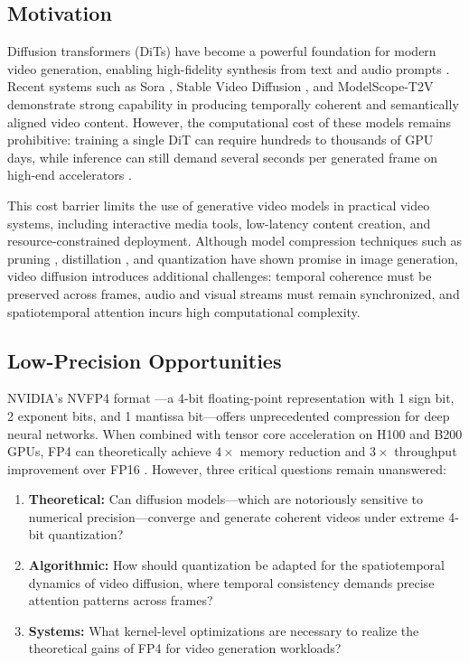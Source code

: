 \documentclass[journal,twoside]{IEEEtran}
\theoremstyle{definition}
\theoremstyle{remark}
\begin{document}
\subsection{Motivation}
Diffusion transformers (DiTs) \cite{peebles2023scalable} have become a powerful foundation for modern video generation, enabling high-fidelity synthesis from text and audio prompts \cite{ho2022imagen, singer2023make, rombach2022high}. Recent systems such as Sora \cite{openai2024sora}, Stable Video Diffusion \cite{stability2023svd}, and ModelScope-T2V \cite{wang2023modelscope} demonstrate strong capability in producing temporally coherent and semantically aligned video content. However, the computational cost of these models remains prohibitive: training a single DiT can require hundreds to thousands of GPU days, while inference can still demand several seconds per generated frame on high-end accelerators \cite{zhang2024analyzing, gupta2024efficient}.

This cost barrier limits the use of generative video models in practical video systems, including interactive media tools, low-latency content creation, and resource-constrained deployment. Although model compression techniques such as pruning \cite{han2016deep}, distillation \cite{hinton2014distilling}, and quantization \cite{jacob2018quantization} have shown promise in image generation, video diffusion introduces additional challenges: temporal coherence must be preserved across frames, audio and visual streams must remain synchronized, and spatiotemporal attention incurs high computational complexity.

\subsection{Low-Precision Opportunities}
NVIDIA's NVFP4 format \cite{nvidia2024nvfp4}---a 4-bit floating-point representation with 1 sign bit, 2 exponent bits, and 1 mantissa bit---offers unprecedented compression for deep neural networks. When combined with tensor core acceleration on H100 and B200 GPUs, FP4 can theoretically achieve $4\times$ memory reduction and $3\times$ throughput improvement over FP16 \cite{nvidia2022h100}. However, three critical questions remain unanswered:

\begin{enumerate}
    \item \textbf{Theoretical:} Can diffusion models---which are notoriously sensitive to numerical precision---converge and generate coherent videos under extreme 4-bit quantization?
    \item \textbf{Algorithmic:} How should quantization be adapted for the spatiotemporal dynamics of video diffusion, where temporal consistency demands precise attention patterns across frames?
    \item \textbf{Systems:} What kernel-level optimizations are necessary to realize the theoretical gains of FP4 for video generation workloads?
\end{enumerate}
\end{document}
